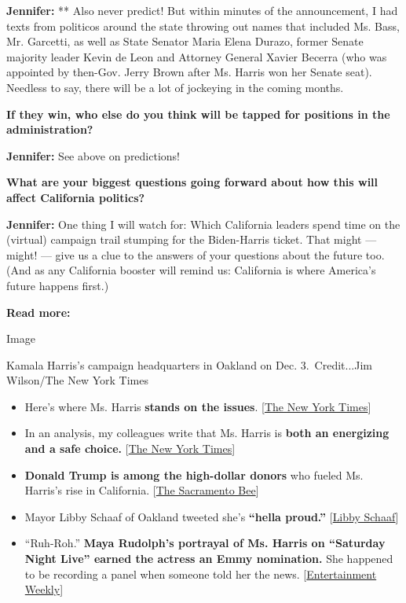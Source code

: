 \textbf{Jennifer:} ** Also never predict! But within minutes of the
announcement, I had texts from politicos around the state throwing out
names that included Ms. Bass, Mr. Garcetti, as well as State Senator
Maria Elena Durazo, former Senate majority leader Kevin de Leon and
Attorney General Xavier Becerra (who was appointed by then-Gov. Jerry
Brown after Ms. Harris won her Senate seat). Needless to say, there will
be a lot of jockeying in the coming months.

\textbf{If they win, who else do you think will be tapped for positions
in the administration?}

\textbf{Jennifer:} See above on predictions!

\textbf{What are your biggest questions going forward about how this
will affect California politics?}

\textbf{Jennifer:} One thing I will watch for: Which California leaders
spend time on the (virtual) campaign trail stumping for the Biden-Harris
ticket. That might --- might! --- give us a clue to the answers of your
questions about the future too. (And as any California booster will
remind us: California is where America's future happens first.)

\textbf{Read more:}

Image

Kamala Harris's campaign headquarters in Oakland on Dec. 3.~Credit...Jim
Wilson/The New York Times

\begin{itemize}
\item
  Here's where Ms. Harris \textbf{stands on the issues}.
  {[}\href{https://www.nytimes3xbfgragh.onion/2020/08/11/us/politics/kamala-harris-issues-policy-positions.html}{The
  New York Times}{]}
\item
  In an analysis, my colleagues write that Ms. Harris is \textbf{both an
  energizing and a safe choice.}
  {[}\href{https://www.nytimes3xbfgragh.onion/2020/08/11/us/politics/kamala-harris-joe-biden-running-mate.html}{The
  New York Times}{]}
\item
  \textbf{Donald Trump is among the high-dollar donors} who fueled Ms.
  Harris's rise in California.
  {[}\href{https://www.sacbee.com/news/politics-government/capitol-alert/article226975319.html}{The
  Sacramento Bee}{]}
\item
  Mayor Libby Schaaf of Oakland tweeted she's \textbf{``hella proud.''}
  {[}\href{https://twitter.com/LibbySchaaf/status/1293290829272866816}{Libby
  Schaaf}{]}
\item
  ``Ruh-Roh.'' \textbf{Maya Rudolph's portrayal of Ms. Harris on
  ``Saturday Night Live'' earned the actress an Emmy nomination.} She
  happened to be recording a panel when someone told her the news.
  {[}\href{https://ew.com/tv/exclusive-maya-rudolph-reacts-to-kamala-harris-vp-pick/}{Entertainment
  Weekly}{]}
\end{itemize}

